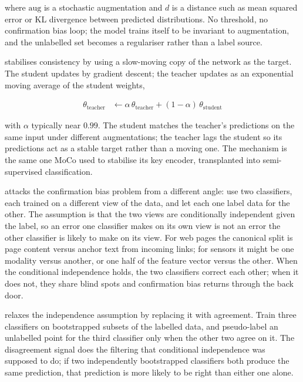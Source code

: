 where $\mathrm{aug}$ is a stochastic augmentation and $d$ is a distance such as mean squared error or KL divergence between predicted distributions.
No threshold, no confirmation bias loop; the model trains itself to be invariant to augmentation, and the unlabelled set becomes a regulariser rather than a label source.

 stabilises consistency by using a slow-moving copy of the network as the target\cite{Tarvainen2017MeanTeacher}.
The student updates by gradient descent; the teacher updates as an exponential moving average of the student weights,

\begin{align*}
    \theta_{\text{teacher}} &\gets \alpha\, \theta_{\text{teacher}} + (1 - \alpha)\, \theta_{\text{student}}
\end{align*}

with $\alpha$ typically near $0.99$.
The student matches the teacher's predictions on the same input under different augmentations; the teacher lags the student so its predictions act as a stable target rather than a moving one.
The mechanism is the same one MoCo used to stabilise its key encoder, transplanted into semi-supervised classification.


\vspace{1.5em}

 attacks the confirmation bias problem from a different angle: use two classifiers, each trained on a different view of the data, and let each one label data for the other\cite{Blum1998CoTraining}.
The assumption is that the two views are conditionally independent given the label, so an error one classifier makes on its own view is not an error the other classifier is likely to make on its view.
For web pages the canonical split is page content versus anchor text from incoming links; for sensors it might be one modality versus another, or one half of the feature vector versus the other.
When the conditional independence holds, the two classifiers correct each other; when it does not, they share blind spots and confirmation bias returns through the back door.

 relaxes the independence assumption by replacing it with agreement.
Train three classifiers on bootstrapped subsets of the labelled data, and pseudo-label an unlabelled point for the third classifier only when the other two agree on it.
The disagreement signal does the filtering that conditional independence was supposed to do; if two independently bootstrapped classifiers both produce the same prediction, that prediction is more likely to be right than either one alone.

